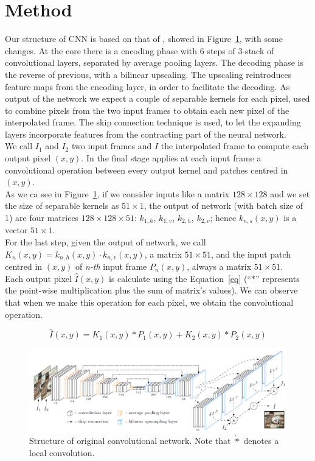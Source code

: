 \documentclass[11pt, a4paper]{article}
\begin{document}
	\section{Method}
	Our structure of CNN is based on that of \cite{mainpaper}, showed in Figure~\ref{original-net}, with some changes. At the core there is a encoding phase with 6 steps of 3-stack of convolutional layers, separated by average pooling layers. The decoding phase is the reverse of previous, with a bilinear upscaling. The upscaling reintroduces feature maps from the encoding layer, in order to facilitate the decoding. As output of the network we expect a couple of separable kernels for each pixel, used to combine pixels from the two input frames to obtain each new pixel of the interpolated frame. The skip connection technique is used, to let the expanding layers incorporate features from the contracting part of the neural network.\\
	We call $I_1$ and $I_2$ two input frames and $\hat{I}$ the interpolated frame to compute each output pixel $(x,y)$. In the final stage applies at each input frame a convolutional operation between every output kernel and patches centred in $(x,y)$.\\
	As we ca see in Figure~\ref{original-net}, if we consider inputs like a matrix $128\times128$ and we set the size of separable kernels as $51\times1$, the output of network (with batch size of 1) are four matrices $128\times128\times51$: $k_{1,h}$, $k_{1,v}$, $k_{2,h}$, $k_{2,v}$; hence $k_{n,s}(x,y)$ is a vector $51\times1$.\\
	For the last step, given the output of network, we call $K_n(x,y) = k_{n,h}(x,y) \cdot k_{n,v}(x,y)$, a matrix $51\times51$, and the input patch centred in $(x,y)$ of \textit{n-th} input frame $P_n(x,y)$, always a matrix $51\times51$.\\
	Each output pixel $\hat{I}(x,y)$ is calculate using the Equation~\ref{eq} (``$*$'' represents the point-wise multiplication plus the sum of matrix's values). We can observe that when we make this operation for each pixel, we obtain the convolutional operation. 
	
	\begin{equation}
		\hat{I}(x,y) = K_1(x,y) * P_1(x,y) + K_2(x,y) * P_2(x,y)
		\label{eq}
	\end{equation}
	
	\begin{figure}
		\centering
		\includegraphics[width=0.6\textheight]{net_structure}
		\caption{Structure of original convolutional network. Note that $\dot{*}$ denotes a local convolution.}
		\label{original-net}
	\end{figure}
\end{document}
